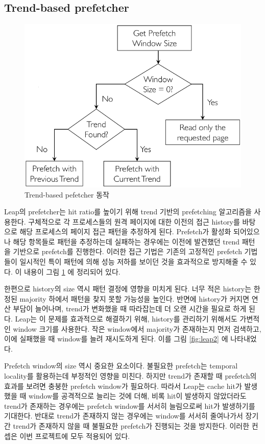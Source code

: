 \documentclass[conference,11pt]{IEEEtran}
\begin{document}
\begin{CJK}{UTF8}{}
    \subsection{Trend-based prefetcher}

    \begin{figure}[t]
        \centerline{\includegraphics[width=\linewidth]{leap1.png}}
        \caption{Trend-based pefetcher 동작}
        \label{fig:leap1}
    \end{figure}

    Leap의 prefetcher는 hit ratio를 높이기 위해 trend 기반의 prefetching 알고리즘을 사용한다. 구체적으로 각 프로세스들의 원격 페이지에 대한 이전의 접근 history를 바탕으로 해당 프로세스의 페이지 접근 패턴을 추정하게 된다. Prefetch가 활성화 되어있으나 해당 항목들로 패턴을 추정하는데 실패하는 경우에는 이전에 발견했던 trend 패턴을 기반으로 prefetch를 진행한다. 이러한 접근 기법은 기존의 고정적인 prefetch 기법들이 일시적인 특이 패턴에 의해 성능 저하를 보이던 것을 효과적으로 방지해줄 수 있다. 이 내용이 그림 \ref{fig:leap1} 에 정리되어 있다.

    한편으로 history의 size 역시 패턴 결정에 영향을 미치게 된다. 너무 적은 history는 한정된 majority 하에서 패턴을 찾지 못할 가능성을 높인다. 반면에 history가 커지면 연산 부담이 늘어나며, trend가 변화했을 때 따라잡는데 더 오랜 시간을 필요로 하게 된다. Leap는 이 문제를 효과적으로 해결하기 위해, history를 관리하기 위해서도 가변적인 window 크기를 사용한다. 작은 window에서 majority가 존재하는지 먼저 검색하고, 이에 실패했을 때 window를 늘려 재시도하게 된다. 이를 그림 \ref{fig:leap2} 에 나타내었다.

    Prefetch window의 size 역시 중요한 요소이다. 불필요한 prefetch는 temporal locality를 활용하는데 부정적인 영향을 미친다. 하지만 trend가 존재할 때 prefetch의 효과를 보려면 충붕한 prefetch window가 필요하다. 따라서 Leap는 cache hit가 발생했을 때 window를 공격적으로 늘리는 것에 더해, 비록 hit이 발생하지 않았더라도 trend가 존재하는 경우에는 prefetch window를 서서히 늘림으로써 hit가 발생하기를 기대한다. 반대로 trend가 존재하지 않는 경우에는 window를 서서히 줄여나가서 장기간 trend가 존재하지 않을 때 불필요한 prefetch가 진행되는 것을 방지한다. 이러한 컨셉은 이번 프로젝트에 모두 적용되어 있다.


\end{CJK}
\end{document}
